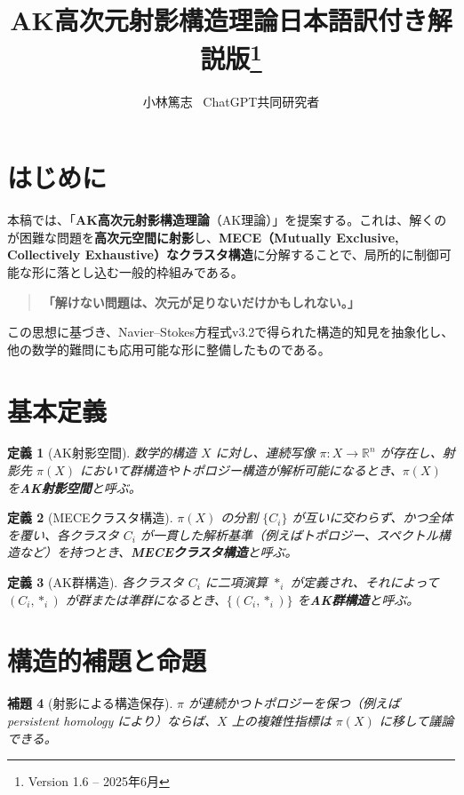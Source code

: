 \documentclass[11pt]{article}
\title{AK高次元射影構造理論\（日本語訳付き解説版\）\thanks{Version 1.6 -- 2025年6月}}
\author{小林篤志 \ ChatGPT共同研究者}
\date{}
\newtheorem{definition}{定義}[section]
\newtheorem{lemma}[definition]{補題}
\begin{document}
\maketitle

\section*{はじめに}

本稿では、「\textbf{AK高次元射影構造理論}（AK理論）」を提案する。これは、解くのが困難な問題を\textbf{高次元空間に射影}し、\textbf{MECE（Mutually Exclusive, Collectively Exhaustive）なクラスタ構造}に分解することで、局所的に制御可能な形に落とし込む一般的枠組みである。

\begin{quote}
\textbf{「解けない問題は、次元が足りないだけかもしれない。」}
\end{quote}

この思想に基づき、Navier--Stokes方程式v3.2で得られた構造的知見を抽象化し、他の数学的難問にも応用可能な形に整備したものである。

\section{基本定義}

\begin{definition}[AK射影空間]
数学的構造 $X$ に対し、連続写像 $\pi: X \to \mathbb{R}^n$ が存在し、射影先 $\pi(X)$ において群構造やトポロジー構造が解析可能になるとき、$\pi(X)$ を\textbf{AK射影空間}と呼ぶ。
\end{definition}

\begin{definition}[MECEクラスタ構造]
$\pi(X)$ の分割 $\{C_i\}$ が互いに交わらず、かつ全体を覆い、各クラスタ $C_i$ が一貫した解析基準（例えばトポロジー、スペクトル構造など）を持つとき、\textbf{MECEクラスタ構造}と呼ぶ。
\end{definition}

\begin{definition}[AK群構造]
各クラスタ $C_i$ に二項演算 $*_i$ が定義され、それによって $(C_i, *_i)$ が群または準群になるとき、$\{(C_i, *_i)\}$ を\textbf{AK群構造}と呼ぶ。
\end{definition}

\section{構造的補題と命題}

\begin{lemma}[射影による構造保存]
$\pi$ が連続かつトポロジーを保つ（例えば persistent homology により）ならば、$X$ 上の複雑性指標は $\pi(X)$ に移して議論できる。
\end{lemma}
\end{document}
